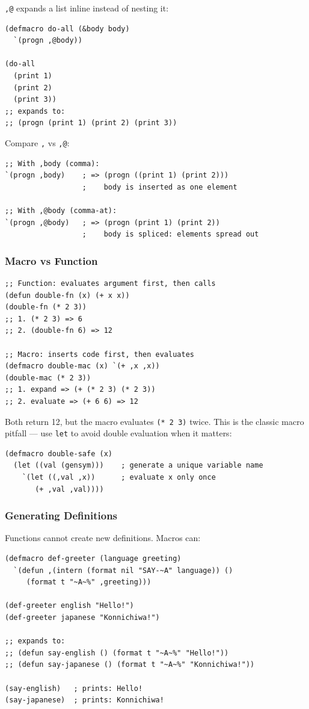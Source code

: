 \texttt{,@} expands a list inline instead of nesting it:

\begin{lstlisting}
(defmacro do-all (&body body)
  `(progn ,@body))

(do-all
  (print 1)
  (print 2)
  (print 3))
;; expands to:
;; (progn (print 1) (print 2) (print 3))
\end{lstlisting}

Compare \texttt{,} vs \texttt{,@}:

\begin{lstlisting}
;; With ,body (comma):
`(progn ,body)    ; => (progn ((print 1) (print 2)))
                  ;    body is inserted as one element

;; With ,@body (comma-at):
`(progn ,@body)   ; => (progn (print 1) (print 2))
                  ;    body is spliced: elements spread out
\end{lstlisting}

\subsubsection{Macro vs Function}

\begin{lstlisting}
;; Function: evaluates argument first, then calls
(defun double-fn (x) (+ x x))
(double-fn (* 2 3))
;; 1. (* 2 3) => 6
;; 2. (double-fn 6) => 12

;; Macro: inserts code first, then evaluates
(defmacro double-mac (x) `(+ ,x ,x))
(double-mac (* 2 3))
;; 1. expand => (+ (* 2 3) (* 2 3))
;; 2. evaluate => (+ 6 6) => 12
\end{lstlisting}

Both return 12, but the macro evaluates \texttt{(* 2 3)} twice.
This is the classic macro pitfall --- use \texttt{let} to avoid
double evaluation when it matters:

\begin{lstlisting}
(defmacro double-safe (x)
  (let ((val (gensym)))    ; generate a unique variable name
    `(let ((,val ,x))      ; evaluate x only once
       (+ ,val ,val))))
\end{lstlisting}

\subsubsection{Generating Definitions}

Functions cannot create new definitions. Macros can:

\begin{lstlisting}
(defmacro def-greeter (language greeting)
  `(defun ,(intern (format nil "SAY-~A" language)) ()
     (format t "~A~%" ,greeting)))

(def-greeter english "Hello!")
(def-greeter japanese "Konnichiwa!")

;; expands to:
;; (defun say-english () (format t "~A~%" "Hello!"))
;; (defun say-japanese () (format t "~A~%" "Konnichiwa!"))

(say-english)   ; prints: Hello!
(say-japanese)  ; prints: Konnichiwa!
\end{lstlisting}

